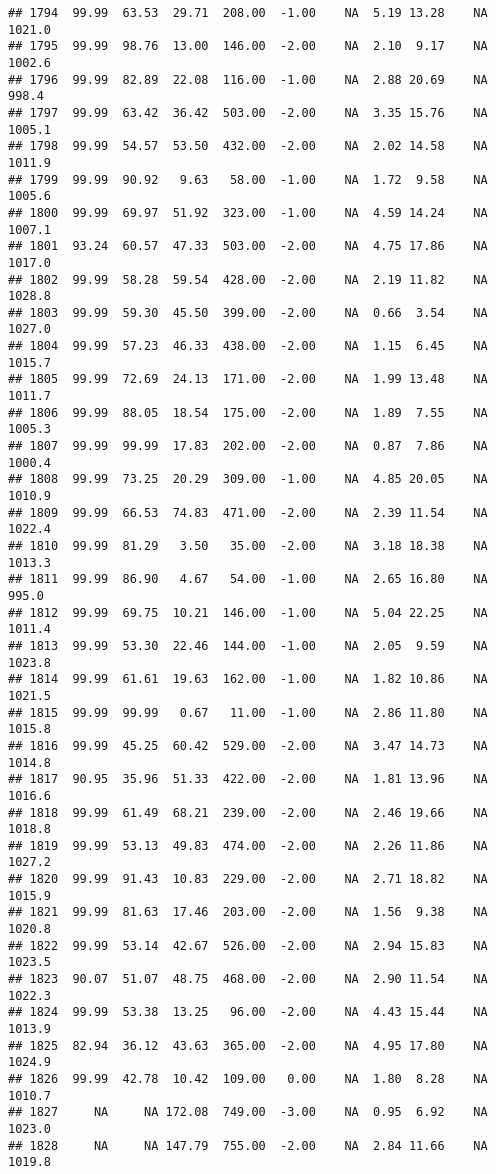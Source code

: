 \documentclass{article}\usepackage{graphicx, color}
\makeatletter
\newenvironment{kframe}{%
 \def\at@end@of@kframe{}%
 \ifinner\ifhmode%
  \def\at@end@of@kframe{\end{minipage}}%
  \begin{minipage}{\columnwidth}%
 \fi\fi%
 \def\FrameCommand##1{\hskip\@totalleftmargin \hskip-\fboxsep
 \colorbox{shadecolor}{##1}\hskip-\fboxsep
     \hskip-\linewidth \hskip-\@totalleftmargin \hskip\columnwidth}%
 \MakeFramed {\advance\hsize-\width
   \@totalleftmargin\z@ \linewidth\hsize
   \@setminipage}}%
 {\par\unskip\endMakeFramed%
 \at@end@of@kframe}
\newenvironment{knitrout}{}{} %
\makeatother
\begin{document}
\begin{knitrout}
\begin{kframe}
\begin{verbatim}
## 1794  99.99  63.53  29.71  208.00  -1.00    NA  5.19 13.28    NA 1021.0
## 1795  99.99  98.76  13.00  146.00  -2.00    NA  2.10  9.17    NA 1002.6
## 1796  99.99  82.89  22.08  116.00  -1.00    NA  2.88 20.69    NA  998.4
## 1797  99.99  63.42  36.42  503.00  -2.00    NA  3.35 15.76    NA 1005.1
## 1798  99.99  54.57  53.50  432.00  -2.00    NA  2.02 14.58    NA 1011.9
## 1799  99.99  90.92   9.63   58.00  -1.00    NA  1.72  9.58    NA 1005.6
## 1800  99.99  69.97  51.92  323.00  -1.00    NA  4.59 14.24    NA 1007.1
## 1801  93.24  60.57  47.33  503.00  -2.00    NA  4.75 17.86    NA 1017.0
## 1802  99.99  58.28  59.54  428.00  -2.00    NA  2.19 11.82    NA 1028.8
## 1803  99.99  59.30  45.50  399.00  -2.00    NA  0.66  3.54    NA 1027.0
## 1804  99.99  57.23  46.33  438.00  -2.00    NA  1.15  6.45    NA 1015.7
## 1805  99.99  72.69  24.13  171.00  -2.00    NA  1.99 13.48    NA 1011.7
## 1806  99.99  88.05  18.54  175.00  -2.00    NA  1.89  7.55    NA 1005.3
## 1807  99.99  99.99  17.83  202.00  -2.00    NA  0.87  7.86    NA 1000.4
## 1808  99.99  73.25  20.29  309.00  -1.00    NA  4.85 20.05    NA 1010.9
## 1809  99.99  66.53  74.83  471.00  -2.00    NA  2.39 11.54    NA 1022.4
## 1810  99.99  81.29   3.50   35.00  -2.00    NA  3.18 18.38    NA 1013.3
## 1811  99.99  86.90   4.67   54.00  -1.00    NA  2.65 16.80    NA  995.0
## 1812  99.99  69.75  10.21  146.00  -1.00    NA  5.04 22.25    NA 1011.4
## 1813  99.99  53.30  22.46  144.00  -1.00    NA  2.05  9.59    NA 1023.8
## 1814  99.99  61.61  19.63  162.00  -1.00    NA  1.82 10.86    NA 1021.5
## 1815  99.99  99.99   0.67   11.00  -1.00    NA  2.86 11.80    NA 1015.8
## 1816  99.99  45.25  60.42  529.00  -2.00    NA  3.47 14.73    NA 1014.8
## 1817  90.95  35.96  51.33  422.00  -2.00    NA  1.81 13.96    NA 1016.6
## 1818  99.99  61.49  68.21  239.00  -2.00    NA  2.46 19.66    NA 1018.8
## 1819  99.99  53.13  49.83  474.00  -2.00    NA  2.26 11.86    NA 1027.2
## 1820  99.99  91.43  10.83  229.00  -2.00    NA  2.71 18.82    NA 1015.9
## 1821  99.99  81.63  17.46  203.00  -2.00    NA  1.56  9.38    NA 1020.8
## 1822  99.99  53.14  42.67  526.00  -2.00    NA  2.94 15.83    NA 1023.5
## 1823  90.07  51.07  48.75  468.00  -2.00    NA  2.90 11.54    NA 1022.3
## 1824  99.99  53.38  13.25   96.00  -2.00    NA  4.43 15.44    NA 1013.9
## 1825  82.94  36.12  43.63  365.00  -2.00    NA  4.95 17.80    NA 1024.9
## 1826  99.99  42.78  10.42  109.00   0.00    NA  1.80  8.28    NA 1010.7
## 1827     NA     NA 172.08  749.00  -3.00    NA  0.95  6.92    NA 1023.0
## 1828     NA     NA 147.79  755.00  -2.00    NA  2.84 11.66    NA 1019.8

\end{verbatim}
\end{kframe}
\end{knitrout}
\end{document}
